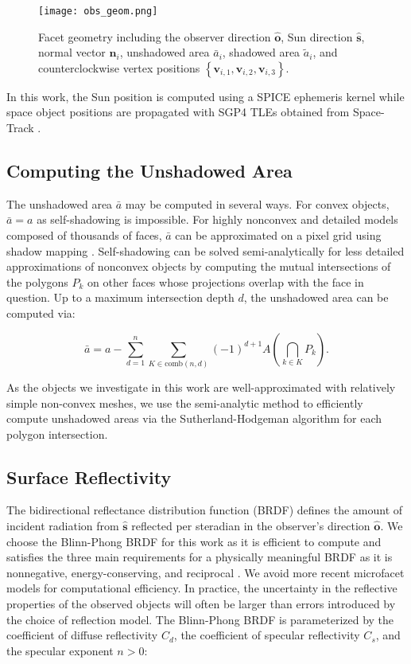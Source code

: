 \documentclass[a4paper,twocolumn]{spaceDebrisC} %
\newcommand{\vctr}[1]{\bm{#1}}
\newcommand{\unitv}[1]{\hat{\vctr{#1}}}
\newcommand{\figmed}[0]{0.4\textwidth}
\begin{document}
\begin{figure}[H]
  \centering
  \texttt{[image: obs\_geom.png]}
  \caption{Facet geometry including the observer direction $\unitv{o}$, Sun direction $\unitv{s}$, normal vector $\unitv{n}_i$, unshadowed area $\bar{a}_i$, shadowed area $\tilde{a}_i$, and counterclockwise vertex positions $\left\{ \vctr{v}_{i,1}, \vctr{v}_{i,2}, \vctr{v}_{i,3} \right\}$.}
  \label{fig:facet_geom}
\end{figure}

In this work, the Sun position is computed using a SPICE ephemeris kernel \cite{spice} while space object positions are propagated with SGP4 TLEs obtained from Space-Track \cite{spacetrack}.

\subsection{Computing the Unshadowed Area}

The unshadowed area $\bar{a}$ may be computed in several ways. For convex objects, $\bar{a}=a$ as self-shadowing is impossible. For highly nonconvex and detailed models composed of thousands of faces, $\bar{a}$ can be approximated on a pixel grid using shadow mapping \cite{robinson2022}. Self-shadowing can be solved semi-analytically for less detailed approximations of nonconvex objects by computing the mutual intersections of the polygons $P_k$ on other faces whose projections overlap with the face in question. Up to a maximum intersection depth $d$, the unshadowed area can be computed via:

\begin{equation} \label{eq:us_area}
 \bar{a} = a - \sum_{d=1}^{n} \sum_{K \in \text{comb}(n,d)} (-1)^{d+1} A\left(\bigcap\limits_{k \in K} P_k\right).
\end{equation}

As the objects we investigate in this work are well-approximated with relatively simple non-convex meshes, we use the semi-analytic method to efficiently compute unshadowed areas via the Sutherland-Hodgeman algorithm \cite{sutherland1974} for each polygon intersection.

\subsection{Surface Reflectivity}

The bidirectional reflectance distribution function (BRDF) defines the amount of incident radiation from $\unitv{s}$ reflected per steradian in the observer's direction $\unitv{o}$. We choose the Blinn-Phong \cite{blinn1977} BRDF for this work as it is efficient to compute and satisfies the three main requirements for a physically meaningful BRDF as it is nonnegative, energy-conserving, and reciprocal \cite{duvenhage2013}. We avoid more recent microfacet models for computational efficiency. In practice, the uncertainty in the reflective properties of the observed objects will often be larger than errors introduced by the choice of reflection model. The Blinn-Phong BRDF is parameterized by the coefficient of diffuse reflectivity $C_d$, the coefficient of specular reflectivity $C_s$, and the specular exponent $n>0$:
\end{document}
